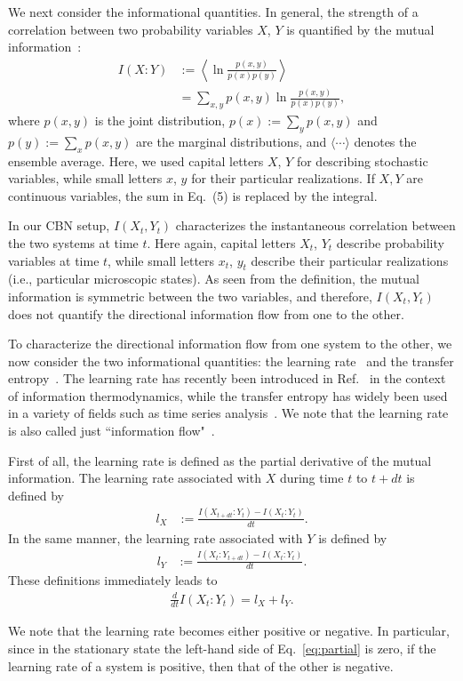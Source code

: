\documentclass[%
 reprint,
 amsmath,amssymb,
 aps,
]{revtex4-1}
\newcommand{\balign}[1]{\begin{align} #1 \end{align}}
\newcommand{\eref}[1]{Eq.~\eqref{#1}}
\theoremstyle{plain}
\begin{document}
We next consider the informational quantities. In general, the strength of a correlation between two probability variables $X$, $Y$ is quantified by the mutual information~\cite{Cover2006}:
\balign{
I(X:Y)&:=\left<\ln \frac{p(x,y)}{p(x)p(y)}\right> \\
&=\sum_{x,y}p(x,y)\ln{\frac{p(x,y)}{p(x)p(y)}},
}
where $p(x,y)$ is the joint distribution, $p(x):=\sum_y p(x,y)$ and $p(y):=\sum_{x}p(x,y)$ are the marginal distributions, and $\langle \cdots \rangle$ denotes the ensemble average. Here, we used capital letters $X$, $Y$ for describing stochastic variables, while small letters $x$, $y$ for their particular realizations. If $X, Y$ are continuous variables, the sum in Eq.~(5) is replaced by the integral. 

In our CBN setup, $I(X_t, Y_t)$ characterizes the instantaneous correlation between the two systems at time $t$. Here again, capital letters $X_t$, $Y_t$ describe probability variables at time $t$, while small letters $x_t$, $y_t$ describe their particular realizations (i.e., particular microscopic states). As seen from the definition, the mutual information is symmetric between the two variables, and therefore, $I(X_t, Y_t)$ does not quantify the directional information flow from one to the other. 

To characterize the  directional information flow from one system to the other, we now consider the two informational quantities: the learning rate~\cite{Barato2014,Hartich2016,Brittain2017,Shiraishi2015(2),phd} and the transfer entropy~\cite{Ito2013,Sagawa2012,Prokopenko2015,Hartich2014,Hartich2016,phd}. The learning rate has recently been introduced in Ref.~\cite{Barato2014} in the context of information thermodynamics, while the transfer entropy has widely been used in a variety of fields such as time series analysis~\cite{time}. We note that the learning rate is also called just ``information flow"~\cite{Horowitz2014,Horowitz2014(2),Rosinberg2016}. 

First of all, the learning rate is defined as the partial derivative of the mutual information. The learning rate associated with $X$ during time $t$ to $t+dt$ is defined by
\balign{
l_X&:=\frac{I(X_{t+dt}:Y_t)-I(X_t:Y_t)}{dt}.
}
In the same manner, the learning rate associated with $Y$ is defined by 
\balign{
l_Y&:=\frac{I(X_t:Y_{t+dt})-I(X_t:Y_t)}{dt}. \label{eq:der}
}
These definitions immediately leads to
\balign{
\frac{d}{dt}I(X_t:Y_t)=l_X+l_Y. \label{eq:partial}
}


We note that the learning rate becomes either positive or negative. In particular, since in the stationary state the left-hand side of \eref{eq:partial} is zero, if the learning rate of a system is positive, then that of the other is negative. 
\end{document}
